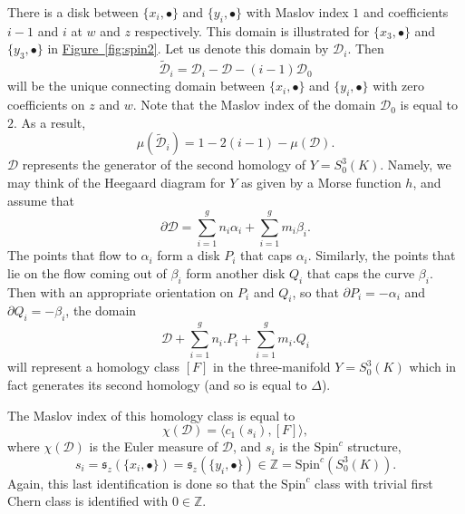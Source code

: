 \documentclass{gtart_h}
\def\figref#1{\hyperlink{#1anchor}{Figure~\ref*{#1}}}
\theoremstyle{definition}
\newcommand{\spinc}{\mathfrak s}
\newcommand{\Z}{\mathbb{Z}}
\newcommand{\SpinC}{{\mathrm{Spin}}^c}
\begin{document}
There is a disk between $\{x_i,\bullet\}$ and $\{y_i,\bullet\}$ with Maslov index
$1$ and coefficients $i-1$ and $i$ at $w$ and $z$ respectively. This domain is illustrated for
$\{x_3,\bullet\}$ and $\{y_3,\bullet\}$ in  \figref{fig:spin2}. Let us denote this domain
by $\mathcal{D}_i$. Then
$$
\tilde{\mathcal{D}}_i=\mathcal{D}_i-\mathcal{D}-(i-1)\mathcal{D}_0
$$
 will be
the unique connecting domain between $\{x_i,\bullet\}$ and $\{y_i,\bullet\}$ with
zero coefficients on $z$ and $w$.
Note that the Maslov index of the domain $\mathcal{D}_0$ is equal to $2$. As a result,
\begin{equation}
\mu(\tilde{\mathcal{D}}_i)=1-2(i-1)-\mu(\mathcal{D}).
\end{equation}
$\mathcal{D}$ represents the generator of the second homology of $Y=S^3_0(K)$. Namely,
we may think of the Heegaard diagram for $Y$ as given by a Morse function $h$, and
assume that
\begin{displaymath}
\partial \mathcal{D}=\sum_{i=1}^{g}n_i\alpha_i+\sum_{i=1}^{g}m_i\beta_i.
\end{displaymath}
The points that flow to $\alpha_i$ form a disk $P_i$ that caps $\alpha_i$. Similarly, the points
that lie on the flow  coming out of $\beta_i$ form another disk $Q_i$ that caps the curve
$\beta_i$. Then with an appropriate orientation on $P_i$ and $Q_i$, so that $\partial P_i=-\alpha_i$
and $\partial Q_i=-\beta_i$, the domain
$$
\mathcal{D}+\sum_{i=1}^{g}n_i.P_i+\sum_{i=1}^{g}m_i.Q_i
$$
will represent a homology class $[F]$ in the three-manifold $Y=S^3_0(K)$ which in fact
generates its second homology (and so is equal to $\Delta$).

The Maslov index of this homology class is equal to
\begin{equation}
\chi({\mathcal{D}})=\langle c_1(s_i),[F]\rangle ,
\end{equation}
where $\chi(\mathcal{D})$ is the Euler measure of $\mathcal{D}$, and $s_i$ is the $\SpinC$
structure,
\begin{displaymath}
s_i=\spinc_z(\{x_i,\bullet\})=\spinc_z(\{y_i,\bullet\})\in \Z=\SpinC(S^3_0(K)).
\end{displaymath}
Again, this last identification is done so that the $\SpinC$ class
with trivial first Chern class is identified with $0\in \Z$.
\end{document}
